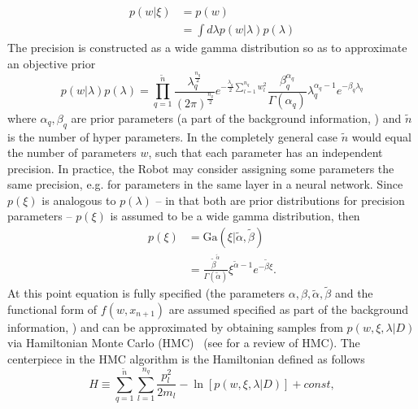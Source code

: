 \begin{equation}
	\begin{split}
		p(w|\xi) & = p(w)\\
		& = \int d\lambda p(w|\lambda)p(\lambda)
	\end{split}
	\label{eq:prior1}
\end{equation}
The precision is constructed as a wide gamma distribution so as to approximate an objective prior
\begin{equation}
	p(w|\lambda)p(\lambda)
	= \prod_{q=1}^{\tilde{n}} \frac{\lambda_q^\frac{n_q}{2}}{(2\pi)^\frac{n_q}{2}}e^{-\frac{\lambda_q}{2}\sum_{l=1}^{n_q}w_l^2}\frac{\beta_q^{\alpha_q}}{\Gamma(\alpha_q)}\lambda_q^{\alpha_q-1}e^{-\beta_q \lambda_q}
	\label{eq:prior}
\end{equation}
where $\alpha_q,\beta_q$ are prior parameters (a part of the background information, ) and $\tilde{n}$ is the number of hyper parameters. In the completely general case $\tilde{n}$ would equal the number of parameters $w$, such that each parameter has an independent precision. In practice, the Robot may consider assigning some parameters the same precision, e.g. for parameters in the same layer in a neural network. Since $p(\xi)$ is analogous to $p(\lambda)$ -- in that both are prior distributions for precision parameters -- $p(\xi)$ is assumed to be a wide gamma distribution, then
\begin{equation}
	\begin{split}
		p(\xi) & = \text{Ga}(\xi|\tilde{\alpha},\tilde{\beta})\\
		& =\frac{\tilde{\beta}^{\tilde{\alpha}}}{\Gamma(\tilde{\alpha})}\xi^{\tilde{\alpha}-1}e^{-\tilde{\beta} \xi}.
	\end{split}
	\label{p7}
\end{equation}
At this point equation  is fully specified (the parameters $\alpha,\beta,\tilde{\alpha},\tilde{\beta}$ and the functional form of $f(w,x_{n+1})$ are assumed specified as part of the background information, ) and can be approximated by obtaining samples from $p(w,\xi,\lambda|D)$ via Hamiltonian Monte Carlo (HMC)~\citep{Hammersley1964,Duane:1987de,Neal:1996,Neal2012} (see  for a review of HMC). The centerpiece in the HMC algorithm is the Hamiltonian defined as follows~\citep{Neal:1996,Neal2012}
\begin{equation}
	H \equiv  \sum_{q=1}^{\tilde{n}}\sum_{l=1}^{n_q}\frac{p_{l}^2}{2m_{l}}-\ln[p(w,\xi,\lambda|D)]+const,
	\label{eqh}
\end{equation}
